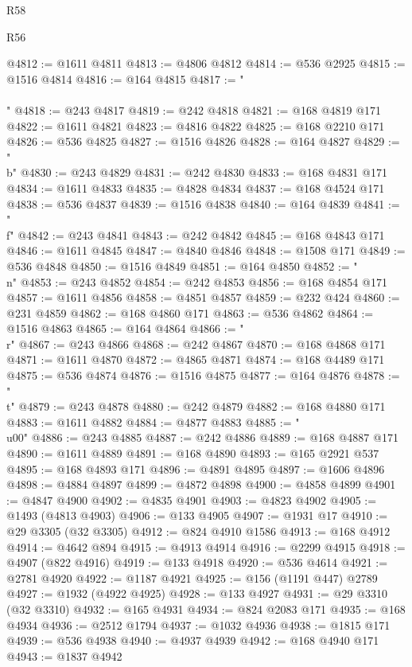\begin{lexlean}{R58}
\begin{lexlean}{R56}
\begin{coremodule}
{{{{{{{{{{{{{{{{{{{{{{{{{{{{{{{{{{{{{{{{{{{{{{{{{{{{{{{{{{{{{{{{{{{{{{{{{{{{{{{{{{{{{{{{{{{{{{{{{{{{{{{{{{{{{{{{{{{{{{{{{{{{{{{{{{{{{{{{{{{{{{{{{{{{{{{{{{{{{{{{{{{{{{{{{{{{{{{{{{{{{{{{{{{{{{{{{{{{{{{{{{{{{{{{{{{@4812 := @1611 @4811
@4813 := @4806 @4812
@4814 := @536 @2925
@4815 := @1516 @4814
@4816 := @164 @4815
@4817 := "\\\\"
@4818 := @243 @4817
@4819 := @242 @4818
@4821 := @168 @4819 @171
@4822 := @1611 @4821
@4823 := @4816 @4822
@4825 := @168 @2210 @171
@4826 := @536 @4825
@4827 := @1516 @4826
@4828 := @164 @4827
@4829 := "\\b"
@4830 := @243 @4829
@4831 := @242 @4830
@4833 := @168 @4831 @171
@4834 := @1611 @4833
@4835 := @4828 @4834
@4837 := @168 @4524 @171
@4838 := @536 @4837
@4839 := @1516 @4838
@4840 := @164 @4839
@4841 := "\\f"
@4842 := @243 @4841
@4843 := @242 @4842
@4845 := @168 @4843 @171
@4846 := @1611 @4845
@4847 := @4840 @4846
@4848 := @1508 @171
@4849 := @536 @4848
@4850 := @1516 @4849
@4851 := @164 @4850
@4852 := "\\n"
@4853 := @243 @4852
@4854 := @242 @4853
@4856 := @168 @4854 @171
@4857 := @1611 @4856
@4858 := @4851 @4857
@4859 := @232 @424
@4860 := @231 @4859
@4862 := @168 @4860 @171
@4863 := @536 @4862
@4864 := @1516 @4863
@4865 := @164 @4864
@4866 := "\\r"
@4867 := @243 @4866
@4868 := @242 @4867
@4870 := @168 @4868 @171
@4871 := @1611 @4870
@4872 := @4865 @4871
@4874 := @168 @4489 @171
@4875 := @536 @4874
@4876 := @1516 @4875
@4877 := @164 @4876
@4878 := "\\t"
@4879 := @243 @4878
@4880 := @242 @4879
@4882 := @168 @4880 @171
@4883 := @1611 @4882
@4884 := @4877 @4883
@4885 := "\\u00"
@4886 := @243 @4885
@4887 := @242 @4886
@4889 := @168 @4887 @171
@4890 := @1611 @4889
@4891 := @168 @4890
@4893 := @165 @2921 @537
@4895 := @168 @4893 @171
@4896 := @4891 @4895
@4897 := @1606 @4896
@4898 := @4884 @4897
@4899 := @4872 @4898
@4900 := @4858 @4899
@4901 := @4847 @4900
@4902 := @4835 @4901
@4903 := @4823 @4902
@4905 := @1493 (@4813 @4903)
@4906 := @133 @4905
@4907 := @1931 @17
@4910 := @29 @3305 (@32 @3305)
@4912 := @824 @4910 @1586
@4913 := @168 @4912
@4914 := @4642 @894
@4915 := @4913 @4914
@4916 := @2299 @4915
@4918 := @4907 (@822 @4916)
@4919 := @133 @4918
@4920 := @536 @4614
@4921 := @2781 @4920
@4922 := @1187 @4921
@4925 := @156 (@1191 @447) @2789
@4927 := @1932 (@4922 @4925)
@4928 := @133 @4927
@4931 := @29 @3310 (@32 @3310)
@4932 := @165 @4931
@4934 := @824 @2083 @171
@4935 := @168 @4934
@4936 := @2512 @1794
@4937 := @1032 @4936
@4938 := @1815 @171
@4939 := @536 @4938
@4940 := @4937 @4939
@4942 := @168 @4940 @171
@4943 := @1837 @4942
}}}}}}}}}}}}}}}}}}}}}}}}}}}}}}}}}}}}}}}}}}}}}}}}}}}}}}}}}}}}}}}}}}}}}}}}}}}}}}}}}}}}}}}}}}}}}}}}}}}}}}}}}}}}}}}}}}}}}}}}}}}}}}}}}}}}}}}}}}}}}}}}}}}}}}}}}}}}}}}}}}}}}}}}}}}}}}}}}}}}}}}}}}}}}}}}}}}}}}}}}}}}}}}}}}}
\end{coremodule}
\end{lexlean}
\end{lexlean}

